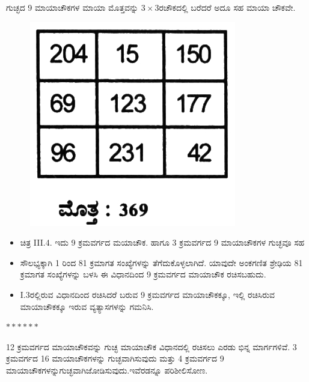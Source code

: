 ಗುಚ್ಛದ 9 ಮಾಯಾಚೌಕಗಳ ಮಾಯಾ ಮೊತ್ತವನ್ನು $3 \times 3$ರಚೌಕದಲ್ಲಿ ಬರೆದರೆ ಅದೂ ಸಹ ಮಾಯಾ ಚೌಕವೇ.
\begin{figure}[h]
\includegraphics{src/figures/chap3/fig3.32.jpg}
\end{figure}

\begin{itemize}
	\item ಚಿತ್ರ  III.4. ಇದು 9 ಕ್ರಮವರ್ಗದ ಮಯಾಚೌಕ. ಹಾಗೂ 3 ಕ್ರಮವರ್ಗದ 9 ಮಾಯಾಚೌಕಗಳ ಗುಚ್ಛವೂ ಸಹ
	\item ಸೌಲಭ್ಯಕ್ಕಾಗಿ 1 ರಿಂದ 81 ಕ್ರಮಾಗತ ಸಂಖ್ಯೆಗಳನ್ನು ತೆಗೆದುಕೊಳ್ಳಲಾಗಿದೆ. ಯಾವುದೇ ಅಂಕಗಣಿತ ಶ್ರೇಢಿಯ 81 ಕ್ರಮಾಗತ ಸಂಖ್ಯೆಗಳನ್ನು ಬಳಸಿ ಈ ವಿಧಾನದಿಂದ 9 ಕ್ರಮವರ್ಗದ ಮಾಯಾಚೌಕ ರಚಿಸಬಹುದು.
	\item I.3ರಲ್ಲಿರುವ ವಿಧಾನದಿಂದ ರಚಿಸಿದರೆ ಬರುವ 9 ಕ್ರಮವರ್ಗದ ಮಾಯಾಚೌಕಕ್ಕೂ, ಇಲ್ಲಿ ರಚಿಸಿರುವ ಮಾಯಾಚೌಕಕ್ಕೂ ಇರುವ ವ್ಯತ್ಯಾಸಗಳನ್ನು ಗಮನಿಸಿ.
\end{itemize}
\begin{center}
$******$
\end{center}

12 ಕ್ರಮವರ್ಗದ ಮಾಯಾಚೌಕವನ್ನು ಗುಚ್ಛ ಮಾಯಾಚೌಕ ವಿಧಾನದಲ್ಲಿ ರಚಿಸಲು ಎರಡು ಭಿನ್ನ ಮಾರ್ಗಗಳಿವೆ. 3 ಕ್ರಮವರ್ಗದ 16 ಮಾಯಾಚೌಕಗಳನ್ನು ಗುಚ್ಛವಾಗಿಸುವುದು ಮತ್ತು 4 ಕ್ರಮವರ್ಗದ 9 ಮಾಯಾಚೌಕಗಳನ್ನುಗುಚ್ಛವಾಗಿಜೋಡಿಸುವುದು.ಇವೆರಡನ್ನೂ ಪರಿಶೀಲಿಸೋಣ.

